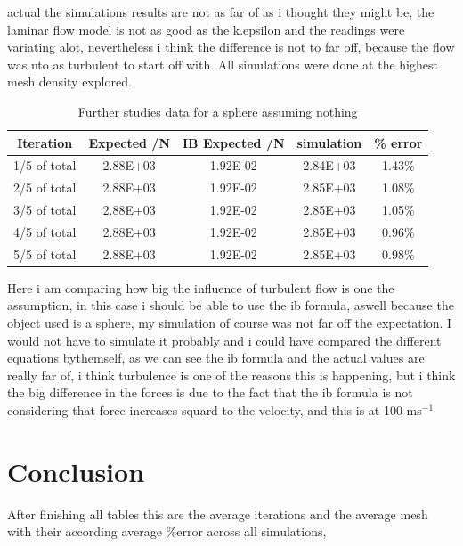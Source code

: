 \documentclass[12pt,a4paper]{article}
\begin{document}
actual the simulations results are not as far of as i thought they might be, the laminar flow model is not as good as the k.epsilon and the readings were variating alot, nevertheless i think the difference is not to far off, because the flow was nto as turbulent to start off with. All simulations were done at the highest mesh density explored.

\begin{table}[H]
\centering
\caption{Further studies data for a sphere assuming nothing}
\label{tab:sphere_ib}
\begin{tabular}{|c|c|c|c|c|}
\hline
\rowcolor{lightblue}
\textbf{Iteration} & \textbf{Expected /N} & \textbf{IB Expected /N} & \textbf{simulation} & \textbf{\% error} \\
\hline
1/5 of total & 2.88E+03 & 1.92E-02 & 2.84E+03 & 1.43\% \\
\hline
2/5 of total & 2.88E+03 & 1.92E-02 & 2.85E+03 & 1.08\% \\
\hline
3/5 of total & 2.88E+03 & 1.92E-02 & 2.85E+03 & 1.05\% \\
\hline
4/5 of total & 2.88E+03 & 1.92E-02 & 2.85E+03 & 0.96\% \\
\hline
5/5 of total & 2.88E+03 & 1.92E-02 & 2.85E+03 & 0.98\% \\
\hline
\end{tabular}
\end{table}

Here i am comparing how big the influence of turbulent flow is one the assumption, in this case i should be able to use the ib formula, aswell because the object used is a sphere, my simulation of course was not far off the expectation. I would not have to simulate it probably and i could have compared the different equations bythemself, as we can see the ib formula and the actual values are really far of, i think turbulence is one of the reasons this is happening, but i think the big difference in the forces is due to the fact that the ib formula is not considering that force increases squard to the velocity, and this is at 100 ms$^{-1}$

\section{Conclusion}

After finishing all tables this are the average iterations and the average mesh with their according average \%error across all simulations,
\end{document}
